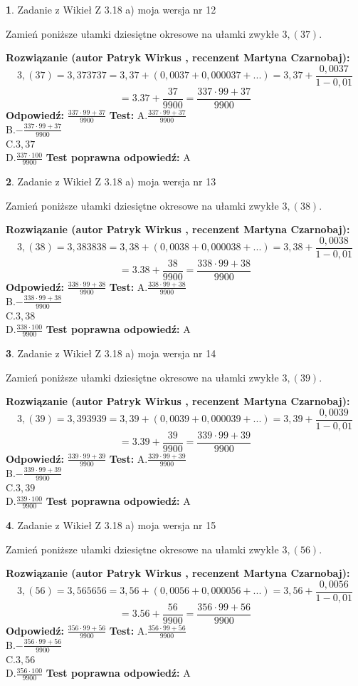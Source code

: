 \documentclass[12pt, a4paper]{article}
\theoremstyle{definition} %
\newtheorem{zad}{}
\newcommand{\zadStart}[1]{\begin{zad}#1\newline}
\newcommand{\zadStop}{\end{zad}}
\newcommand{\rozwStart}[2]{\noindent \textbf{Rozwiązanie (autor #1 , recenzent #2): }\newline}
\newcommand{\rozwStop}{\newline}
\newcommand{\odpStart}{\noindent \textbf{Odpowiedź:}\newline}
\newcommand{\odpStop}{\newline}
\newcommand{\testStart}{\noindent \textbf{Test:}\newline}
\newcommand{\testStop}{\newline}
\newcommand{\kluczStart}{\noindent \textbf{Test poprawna odpowiedź:}\newline}
\newcommand{\kluczStop}{\newline}
\begin{document}
\zadStart{Zadanie z Wikieł Z 3.18 a) moja wersja nr 12}

Zamień poniższe ułamki dziesiętne okresowe na ułamki zwykłe $3,(37)$.
\zadStop
\rozwStart{Patryk Wirkus}{Martyna Czarnobaj}
$$3,(37)=3,373737=3,37+(0,0037+0,000037+...)=3,37+\frac{0,0037}{1-0,01}$$
$$=3.37+\frac{37}{9900}=\frac{337\cdot99+37}{9900}$$
\rozwStop
\odpStart
$\frac{337\cdot99+37}{9900}$
\odpStop
\testStart
A.$\frac{337\cdot99+37}{9900}$\\ B.$-\frac{337\cdot99+37}{9900}$\\ C.$3,37$\\ D.$\frac{337\cdot100}{9900}$
\testStop
\kluczStart
A
\kluczStop



\zadStart{Zadanie z Wikieł Z 3.18 a) moja wersja nr 13}

Zamień poniższe ułamki dziesiętne okresowe na ułamki zwykłe $3,(38)$.
\zadStop
\rozwStart{Patryk Wirkus}{Martyna Czarnobaj}
$$3,(38)=3,383838=3,38+(0,0038+0,000038+...)=3,38+\frac{0,0038}{1-0,01}$$
$$=3.38+\frac{38}{9900}=\frac{338\cdot99+38}{9900}$$
\rozwStop
\odpStart
$\frac{338\cdot99+38}{9900}$
\odpStop
\testStart
A.$\frac{338\cdot99+38}{9900}$\\ B.$-\frac{338\cdot99+38}{9900}$\\ C.$3,38$\\ D.$\frac{338\cdot100}{9900}$
\testStop
\kluczStart
A
\kluczStop



\zadStart{Zadanie z Wikieł Z 3.18 a) moja wersja nr 14}

Zamień poniższe ułamki dziesiętne okresowe na ułamki zwykłe $3,(39)$.
\zadStop
\rozwStart{Patryk Wirkus}{Martyna Czarnobaj}
$$3,(39)=3,393939=3,39+(0,0039+0,000039+...)=3,39+\frac{0,0039}{1-0,01}$$
$$=3.39+\frac{39}{9900}=\frac{339\cdot99+39}{9900}$$
\rozwStop
\odpStart
$\frac{339\cdot99+39}{9900}$
\odpStop
\testStart
A.$\frac{339\cdot99+39}{9900}$\\ B.$-\frac{339\cdot99+39}{9900}$\\ C.$3,39$\\ D.$\frac{339\cdot100}{9900}$
\testStop
\kluczStart
A
\kluczStop



\zadStart{Zadanie z Wikieł Z 3.18 a) moja wersja nr 15}

Zamień poniższe ułamki dziesiętne okresowe na ułamki zwykłe $3,(56)$.
\zadStop
\rozwStart{Patryk Wirkus}{Martyna Czarnobaj}
$$3,(56)=3,565656=3,56+(0,0056+0,000056+...)=3,56+\frac{0,0056}{1-0,01}$$
$$=3.56+\frac{56}{9900}=\frac{356\cdot99+56}{9900}$$
\rozwStop
\odpStart
$\frac{356\cdot99+56}{9900}$
\odpStop
\testStart
A.$\frac{356\cdot99+56}{9900}$\\ B.$-\frac{356\cdot99+56}{9900}$\\ C.$3,56$\\ D.$\frac{356\cdot100}{9900}$
\testStop
\kluczStart
A
\kluczStop
\end{document}
